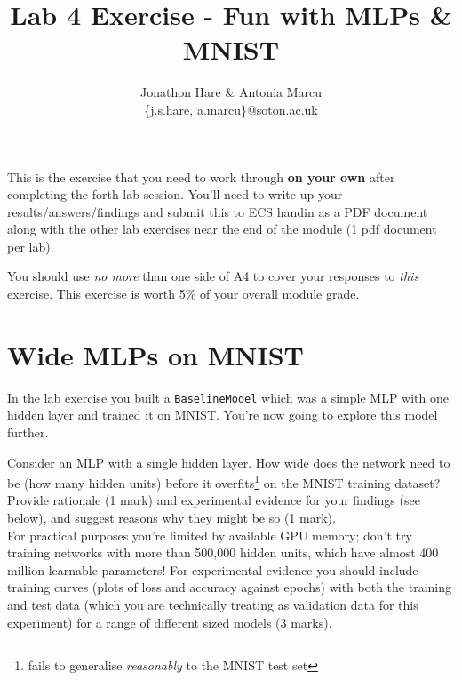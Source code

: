 \documentclass[a4paper]{article}
\begin{document}
\lstset{language=Python,upquote=true}

\setlength{\leftskip}{20pt}
\title{Lab 4 Exercise - Fun with MLPs \& MNIST}
\author{Jonathon Hare \& Antonia Marcu\\\{j.s.hare, a.marcu\}@soton.ac.uk}

\maketitle


This is the exercise that you need to work through \textbf{on your own} after completing the forth lab session. You'll need to write up your results/answers/findings and submit this to ECS handin as a PDF document along with the other lab exercises near the end of the module (1 pdf document per lab). 

You should use \emph{no more} than one side of A4 to cover your responses to \emph{this} exercise. This exercise is worth 5\% of your overall module grade.

\section{Wide MLPs on MNIST}\label{wide}

In the lab exercise you built a \texttt{BaselineModel} which was a simple MLP with one hidden layer and trained it on MNIST. You're now going to explore this model further.

\begin{tcolorbox}[title=1.1 Wider MLPs (5 marks)]
Consider an MLP with a single hidden layer. How wide does the network need to be (how many hidden units) before it overfits\footnote{fails to generalise \emph{reasonably} to the MNIST test set} on the MNIST training dataset? Provide rationale (1 mark) and experimental evidence for your findings (see below), and suggest reasons why they might be so (1 mark).
\\[1em]
For practical purposes you're limited by available GPU memory; don't try training networks with more than 500,000 hidden units, which have almost 400 million learnable parameters! For experimental evidence you should include training curves (plots of loss and accuracy against epochs) with both the training and test data (which you are technically treating as validation data for this experiment) for a range of different sized models (3 marks).
\end{tcolorbox}
\end{document}
